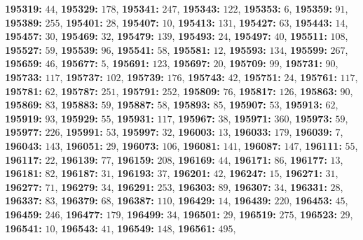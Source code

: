 \textsf{\bfseries 195319:} $44$, \textsf{\bfseries 195329:} $178$, \textsf{\bfseries 195341:} $247$, \textsf{\bfseries 195343:} $122$, \textsf{\bfseries 195353:} $6$, \textsf{\bfseries 195359:} $91$, \textsf{\bfseries 195389:} $255$, \textsf{\bfseries 195401:} $28$, \textsf{\bfseries 195407:} $10$, \textsf{\bfseries 195413:} $131$, \textsf{\bfseries 195427:} $63$, \textsf{\bfseries 195443:} $14$, \textsf{\bfseries 195457:} $30$, \textsf{\bfseries 195469:} $32$, \textsf{\bfseries 195479:} $139$, \textsf{\bfseries 195493:} $24$, \textsf{\bfseries 195497:} $40$, \textsf{\bfseries 195511:} $108$, \textsf{\bfseries 195527:} $59$, \textsf{\bfseries 195539:} $96$, \textsf{\bfseries 195541:} $58$, \textsf{\bfseries 195581:} $12$, \textsf{\bfseries 195593:} $134$, \textsf{\bfseries 195599:} $267$, \textsf{\bfseries 195659:} $46$, \textsf{\bfseries 195677:} $5$, \textsf{\bfseries 195691:} $123$, \textsf{\bfseries 195697:} $20$, \textsf{\bfseries 195709:} $99$, \textsf{\bfseries 195731:} $90$, \textsf{\bfseries 195733:} $117$, \textsf{\bfseries 195737:} $102$, \textsf{\bfseries 195739:} $176$, \textsf{\bfseries 195743:} $42$, \textsf{\bfseries 195751:} $24$, \textsf{\bfseries 195761:} $117$, \textsf{\bfseries 195781:} $62$, \textsf{\bfseries 195787:} $251$, \textsf{\bfseries 195791:} $252$, \textsf{\bfseries 195809:} $76$, \textsf{\bfseries 195817:} $126$, \textsf{\bfseries 195863:} $90$, \textsf{\bfseries 195869:} $83$, \textsf{\bfseries 195883:} $59$, \textsf{\bfseries 195887:} $58$, \textsf{\bfseries 195893:} $85$, \textsf{\bfseries 195907:} $53$, \textsf{\bfseries 195913:} $62$, \textsf{\bfseries 195919:} $93$, \textsf{\bfseries 195929:} $55$, \textsf{\bfseries 195931:} $117$, \textsf{\bfseries 195967:} $38$, \textsf{\bfseries 195971:} $360$, \textsf{\bfseries 195973:} $59$, \textsf{\bfseries 195977:} $226$, \textsf{\bfseries 195991:} $53$, \textsf{\bfseries 195997:} $32$, \textsf{\bfseries 196003:} $13$, \textsf{\bfseries 196033:} $179$, \textsf{\bfseries 196039:} $7$, \textsf{\bfseries 196043:} $143$, \textsf{\bfseries 196051:} $29$, \textsf{\bfseries 196073:} $106$, \textsf{\bfseries 196081:} $141$, \textsf{\bfseries 196087:} $147$, \textsf{\bfseries 196111:} $55$, \textsf{\bfseries 196117:} $22$, \textsf{\bfseries 196139:} $77$, \textsf{\bfseries 196159:} $208$, \textsf{\bfseries 196169:} $44$, \textsf{\bfseries 196171:} $86$, \textsf{\bfseries 196177:} $13$, \textsf{\bfseries 196181:} $82$, \textsf{\bfseries 196187:} $31$, \textsf{\bfseries 196193:} $37$, \textsf{\bfseries 196201:} $42$, \textsf{\bfseries 196247:} $15$, \textsf{\bfseries 196271:} $31$, \textsf{\bfseries 196277:} $71$, \textsf{\bfseries 196279:} $34$, \textsf{\bfseries 196291:} $253$, \textsf{\bfseries 196303:} $89$, \textsf{\bfseries 196307:} $34$, \textsf{\bfseries 196331:} $28$, \textsf{\bfseries 196337:} $83$, \textsf{\bfseries 196379:} $68$, \textsf{\bfseries 196387:} $110$, \textsf{\bfseries 196429:} $14$, \textsf{\bfseries 196439:} $220$, \textsf{\bfseries 196453:} $45$, \textsf{\bfseries 196459:} $246$, \textsf{\bfseries 196477:} $179$, \textsf{\bfseries 196499:} $34$, \textsf{\bfseries 196501:} $29$, \textsf{\bfseries 196519:} $275$, \textsf{\bfseries 196523:} $29$, \textsf{\bfseries 196541:} $10$, \textsf{\bfseries 196543:} $41$, \textsf{\bfseries 196549:} $148$, \textsf{\bfseries 196561:} $495$, 
